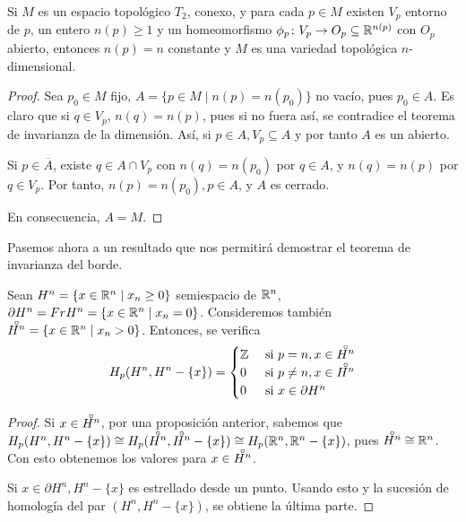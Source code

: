 \begin{corollary}
  Si $M$ es un espacio topológico $T_2$, conexo, y para cada $p \in M$ existen $V_p$ entorno de $p$, un entero
  $n(p) \geq 1$ y un homeomorfismo $\phi_p \colon V_p \to O_p \subseteq \mathbb{R}^{n(p)}$ con $O_p$ abierto, entonces
  $n(p) = n$ constante y $M$ es una variedad topológica $n$-dimensional.
\end{corollary}

\begin{proof}
  Sea $p_0 \in M$ fijo, $A = \{p \in M \mid n(p) = n(p_0)\}$ no vacío, pues $p_0 \in A$. Es claro que si $q \in V_p$,
  $n(q) = n(p)$, pues si no fuera así, se contradice el teorema de invarianza de la dimensión. Así, si $p \in A, V_p \subseteq A$
  y por tanto $A$ es un abierto.

  Si $p \in \overline{A}$, existe $q \in A \cap V_p$ con $n(q) = n(p_0)$ por $q \in A$, y $n(q) = n(p)$ por $q \in V_p$.
  Por tanto, $n(p) = n(p_0), p \in A$, y $A$ es cerrado.

  En consecuencia, $A = M$.
\end{proof}

Pasemos ahora a un resultado que nos permitirá demostrar el teorema de invarianza del borde.

\begin{lemma}
  Sean $H^n = \{x \in \mathbb{R}^n \mid x_n \geq 0 \}$ semiespacio de $\mathbb{R}^n$, $\partial H^n = Fr H^n = \{x \in \mathbb{R}^n \mid x_n = 0\}$.
  Consideremos también $\interior{H^n} = \{x \in \R^n \mid x_n > 0\}$. Entonces, se verifica
  \[H_p(H^n, H^n - \{x\}) =
    \begin{cases} \Z &\text{ si } p = n, x \in \interior{H^n} \\
                  0  &\text{ si } p \neq n, x \in \interior{H^n} \\
                  0  &\text{ si } x \in \partial H^n  \end{cases} \]
\end{lemma}

\begin{proof}
  Si $x \in \interior{H^n}$, por una proposición anterior, sabemos que
  $H_p(H^n, H^n - \{x\}) \cong H_p(\interior{H^n}, \interior{H^n} - \{x\}) \cong H_p(\R^n, \R^n - \{x\})$, pues
  $\interior{H^n} \cong \R^n$. Con esto obtenemos los valores para $x \in \interior{H^n}$.

  Si $x \in \partial H^n, H^n - \{x\}$ es estrellado desde un punto. Usando esto y la sucesión de homología del par $(H^n, H^n - \{x\})$,
  se obtiene la última parte.
\end{proof}

